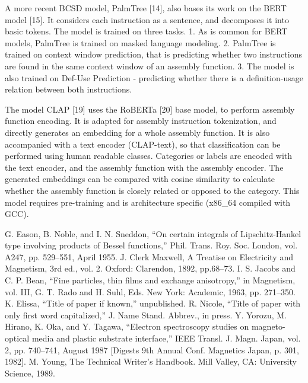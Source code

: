 \documentclass[conference,compsoc]{IEEEtran}
\begin{document}
A more recent BCSD model, PalmTree [14], also bases its work on the BERT model [15].
It considers each instruction as a sentence, and decomposes it into basic tokens. The model is trained
on three tasks. 1. As is common for BERT models, PalmTree is trained on masked language modeling. 2.
PalmTree is trained on context window prediction, that is predicting whether two instructions are found
in the same context window of an assembly function. 3. The model is also trained on Def-Use Prediction -
predicting whether there is a definition-usage relation between both instructions.

The model CLAP [19] uses the RoBERTa [20] base model, to perform assembly function encoding.
It is adapted for assembly instruction tokenization, and directly generates an embedding for
a whole assembly function. It is also accompanied with a text encoder (CLAP-text), so that classification can
be performed using human readable classes. Categories or labels are encoded with the text encoder, and the
assembly function with the assembly encoder. The generated embeddings can be compared with cosine similarity to
calculate whether the assembly function is closely related or opposed to the category. This model requires
pre-training and is architecture specific (x86\_64 compiled with GCC).


\begin{thebibliography}{00}
 G. Eason, B. Noble, and I. N. Sneddon, ``On certain integrals of Lipschitz-Hankel type involving products of Bessel functions,'' Phil. Trans. Roy. Soc. London, vol. A247, pp. 529--551, April 1955.
 J. Clerk Maxwell, A Treatise on Electricity and Magnetism, 3rd ed., vol. 2. Oxford: Clarendon, 1892, pp.68--73.
 I. S. Jacobs and C. P. Bean, ``Fine particles, thin films and exchange anisotropy,'' in Magnetism, vol. III, G. T. Rado and H. Suhl, Eds. New York: Academic, 1963, pp. 271--350.
 K. Elissa, ``Title of paper if known,'' unpublished.
 R. Nicole, ``Title of paper with only first word capitalized,'' J. Name Stand. Abbrev., in press.
 Y. Yorozu, M. Hirano, K. Oka, and Y. Tagawa, ``Electron spectroscopy studies on magneto-optical media and plastic substrate interface,'' IEEE Transl. J. Magn. Japan, vol. 2, pp. 740--741, August 1987 [Digests 9th Annual Conf. Magnetics Japan, p. 301, 1982].
 M. Young, The Technical Writer's Handbook. Mill Valley, CA: University Science, 1989.
\end{thebibliography}
\end{document}
